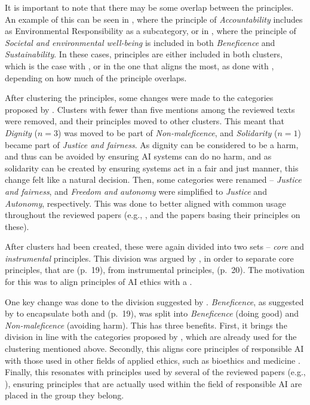 It is important to note that there may be some overlap between the principles. An example of this can be seen in \textcite{Fjeld_2020}, where the principle of \textit{Accountability} includes as Environmental Responsibility as a subcategory, or in \textcite{Mikalef_2022}, where the principle of \textit{Societal and environmental well-being} is included in both \textit{Beneficence} and \textit{Sustainability}. In these cases, principles are either included in both clusters, which is the case with \textcite{Mikalef_2022}, or in the one that aligns the most, as done with \textcite{Fjeld_2020}, depending on how much of the principle overlaps.

After clustering the principles, some changes were made to the categories proposed by \textcite{Ryan_2021}. Clusters with fewer than five mentions among the reviewed texts were removed, and their principles moved to other clusters. This meant that \textit{Dignity} ($n = 3$) was moved to be part of \textit{Non-maleficence}, and \textit{Solidarity} ($n = 1$) became part of \textit{Justice and fairness}. As dignity can be considered to be a harm, and thus can be avoided by ensuring AI systems can do no harm, and as solidarity can be created by ensuring systems act in a fair and just manner, this change felt like a natural decision. Then, some categories were renamed -- \textit{Justice and fairness}, and \textit{Freedom and autonomy} were simplified to \textit{Justice} and \textit{Autonomy}, respectively. This was done to better aligned with common usage throughout the reviewed papers (e.g., \cite{Balagué_2021,Floridi_2018}, and the papers basing their principles on these). 


After clusters had been created, these were again divided into two sets -- \emph{core} and \emph{instrumental} principles. This division was argued by \textcite{Canca_2020}, in order to separate core principles, that are  (p.~19), from instrumental principles,  (p.~20). The motivation for this was to align principles of AI ethics with a  \parencite[p.~19]{Canca_2020}.

One key change was done to the division suggested by \textcite{Canca_2020}. \textit{Beneficence}, as suggested by \textcite{Canca_2020} to encapsulate both  and  (p.~19), was split into \textit{Beneficence} (doing good) and \textit{Non-maleficence} (avoiding harm). This has three benefits. First, it brings the division in line with the categories proposed by \textcite{Ryan_2021}, which are already used for the clustering mentioned above. Secondly, this aligns core principles of responsible AI with those used in other fields of applied ethics, such as bioethics \parencite{Beauchamp_2001} and medicine \parencite{Gillon_2003,Gillon_1994}. Finally, this resonates with principles used by several of the reviewed papers (e.g., \cite{Balagué_2021,Floridi_2018,Jobin_2019,Nauck_2019}), ensuring principles that are actually used within the field of responsible AI are placed in the group they belong.


